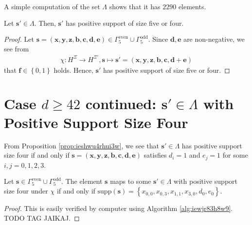 A simple computation of the set \( \Lambda \) shows that it has \( 2290 \) elements.

\begin{proposition}\label{prop:ieshwu4rhui3w}
    Let \( \mathbf{s}' \in \Lambda \). Then, \( \mathbf{s}' \) has positive support of size five or four.
\end{proposition}

\begin{proof}
    Let \( \mathbf{s} = (\mathbf{x}, \mathbf{y}, \mathbf{z}, \mathbf{b}, \mathbf{c}, \mathbf{d}, \mathbf{e}) \in  \Gamma^{\mathrm{even}}_5 \cup \Gamma^{\mathrm{odd}}_5 \). Since \( \mathbf{d}, \mathbf{e} \) are non-negative, we see from
    \begin{gather*}
        \chi: H^\Xi \to H^{\Xi'}, \mathbf{s} \mapsto \mathbf{s}' = (\mathbf{x}, \mathbf{y}, \mathbf{z}, \mathbf{b}, \mathbf{c}, \mathbf{d} + \mathbf{e})
    \end{gather*}
    that \( \mathbf{f} \in \left\{ 0,1 \right\} \) holds. Hence, \( \mathbf{s}' \) has positive support of size five or four.
\end{proof}

\section{Case \( d \geq 42\) continued: \( \mathbf{s}' \in \Lambda\) with Positive Support Size Four}

\begin{corollary}
    From Proposition \ref{prop:ieshwu4rhui3w}, we see that \( \mathbf{s}' \in \Lambda \) has positive support size four if and only if \( \mathbf{s} = (\mathbf{x}, \mathbf{y}, \mathbf{z}, \mathbf{b}, \mathbf{c}, \mathbf{d}, \mathbf{e}) \) satisfies \( d_i = 1 \) and \( e_j = 1 \) for some \( i,j = 0, 1,2,3 \).
\end{corollary}

\begin{corollary}
    Let \( \mathbf{s} \in \Gamma^{\mathrm{even}}_5 \cup \Gamma^{\mathrm{odd}}_5 \). The element \( \mathbf{s} \) maps to some \( \mathbf{s}' \in \Lambda \) with positive support size four under \( \chi \) if and only if \( \mathrm{supp}(\mathbf{s}) = \left\{ x_{0,0}, x_{0,3}, x_{1,1}, x_{3,0}, d_0, e_0 \right\} \).
\end{corollary}

\begin{proof}
    This is easily verified by computer using Algorithm \ref{alg:iewjr83h8w9}. TODO TAG JAIKAJ.
\end{proof}

